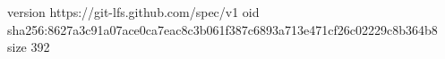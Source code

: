version https://git-lfs.github.com/spec/v1
oid sha256:8627a3c91a07ace0ca7eac8c3b061f387c6893a713e471cf26c02229c8b364b8
size 392
